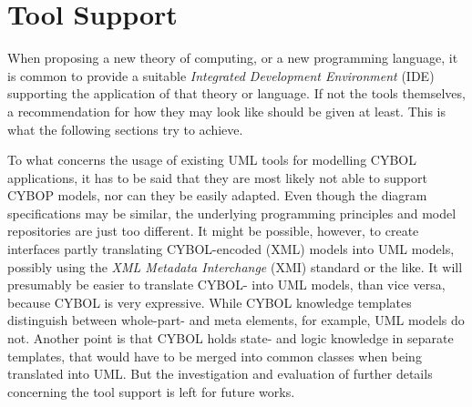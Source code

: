 %
%
%
%
%
%
%

\section{Tool Support}
\label{tool_support_heading}

When proposing a new theory of computing, or a new programming language, it is
common to provide a suitable \emph{Integrated Development Environment} (IDE)
supporting the application of that theory or language. If not the tools
themselves, a recommendation for how they may look like should be given at
least. This is what the following sections try to achieve.





To what concerns the usage of existing UML tools for modelling CYBOL
applications, it has to be said that they are most likely not able to support
CYBOP models, nor can they be easily adapted. Even though the diagram
specifications may be similar, the underlying programming principles and model
repositories are just too different. It might be possible, however, to create
interfaces partly translating CYBOL-encoded (XML) models into UML models,
possibly using the \emph{XML Metadata Interchange} (XMI) standard or the like.
It will presumably be easier to translate CYBOL- into UML models, than vice
versa, because CYBOL is very expressive. While CYBOL knowledge templates
distinguish between whole-part- and meta elements, for example, UML models do
not. Another point is that CYBOL holds state- and logic knowledge in separate
templates, that would have to be merged into common classes when being
translated into UML. But the investigation and evaluation of further details
concerning the tool support is left for future works.
